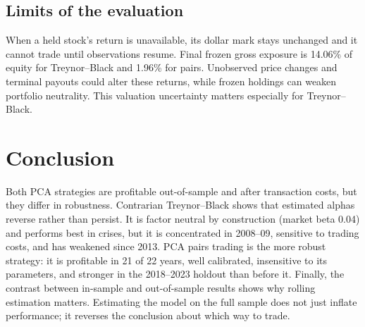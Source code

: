 \documentclass[12pt,letterpaper]{article}
\begin{document}
\subsection{Limits of the evaluation}

When a held stock's return is unavailable, its dollar mark stays unchanged
and it cannot trade until observations resume. Final frozen gross exposure
is 14.06\% of equity for Treynor--Black and 1.96\% for pairs.
Unobserved price changes and terminal payouts could alter these returns,
while frozen holdings can weaken portfolio neutrality. This valuation
uncertainty matters especially for Treynor--Black.

\section{Conclusion}

Both PCA strategies are profitable out-of-sample and after transaction costs, but they differ in robustness. Contrarian Treynor--Black shows that estimated alphas reverse rather than persist. It is factor neutral by construction (market beta 0.04) and performs best in crises, but it is concentrated in 2008--09, sensitive to trading costs, and has weakened since 2013. PCA pairs trading is the more robust strategy: it is profitable in 21 of 22 years, well calibrated, insensitive to its parameters, and stronger in the 2018--2023 holdout than before it. Finally, the contrast between in-sample and out-of-sample results shows why rolling estimation matters. Estimating the model on the full sample does not just inflate performance; it reverses the conclusion about which way to trade.
\end{document}
